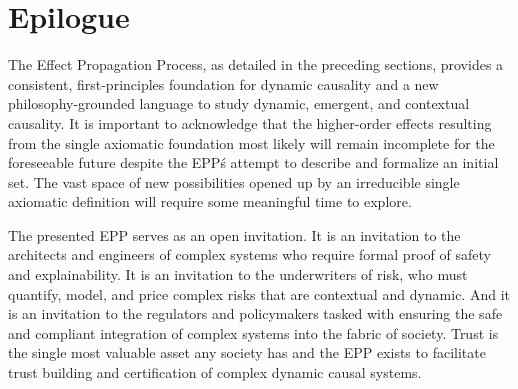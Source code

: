 \section{Epilogue}
\label{sec:epilogue}

 The Effect Propagation Process, as detailed in the preceding sections, provides a consistent, first-principles foundation for dynamic causality and a new philosophy-grounded language to study dynamic, emergent, and contextual causality. It is important to acknowledge that the higher-order effects resulting from the single axiomatic foundation most likely will remain incomplete for the foreseeable future despite the EPP\'s attempt to describe and formalize an initial set. The vast space of new possibilities opened up by  an irreducible single axiomatic definition will require some meaningful time to explore. 

The presented EPP serves as an open invitation. It is an invitation to the architects and engineers of complex systems who require formal proof of safety and explainability. It is an invitation to the underwriters of risk, who must quantify, model, and price complex risks that are contextual and dynamic. And it is an invitation to the regulators and policymakers tasked with ensuring the safe and compliant integration of complex systems into the fabric of society. Trust is the single most valuable asset any society has and the EPP exists to facilitate trust building and certification of complex dynamic causal systems. 

\newpage
